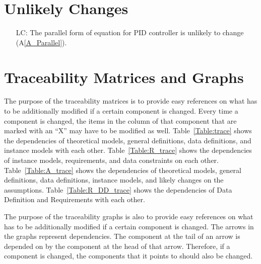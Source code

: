 \documentclass[12pt]{article}
\newcommand{\aref}[1]{A\ref{#1}}
\newcounter{lcnum} %
\begin{document}
\section{Unlikely Changes}    

\noindent \begin{itemize}
 
\item[LC\refstepcounter{lcnum}\thelcnum\label{LC_U_Parallel}:]  The parallel form of equation for PID controller is 
    unlikely to change (\aref{A_Parallel}).

\end{itemize}

\section{Traceability Matrices and Graphs}

The purpose of the traceability matrices is to provide easy references on what
has to be additionally modified if a certain component is changed.  Every time a
component is changed, the items in the column of that component that are marked
with an ``X'' may have to be modified as well.  Table~\ref{Table:trace} shows the
dependencies of theoretical models, general definitions, data definitions, and
instance models with each other. Table~\ref{Table:R_trace} shows the
dependencies of instance models, requirements, and data constraints on each
other. Table~\ref{Table:A_trace} shows the dependencies of theoretical models,
general definitions, data definitions, instance models, and likely changes on
the assumptions. Table~\ref{Table:R_DD_trace} shows the dependencies of Data
Definition and Requirements with each other.

The purpose of the traceability graphs is also to provide easy references on
what has to be additionally modified if a certain component is changed.  The
arrows in the graphs represent dependencies. The component at the tail of an
arrow is depended on by the component at the head of that arrow. Therefore, if a
component is changed, the components that it points to should also be
changed. 


\end{document}
